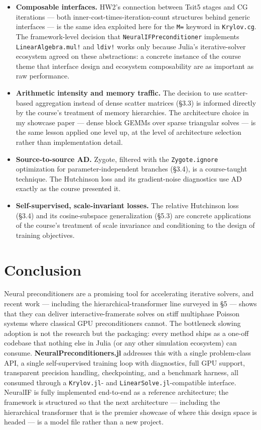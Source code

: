 \documentclass[11pt]{article}
\newcommand{\code}[1]{\texttt{\small #1}}
\begin{document}
\begin{itemize}[leftmargin=*, itemsep=2pt, topsep=2pt]
\item \textbf{Composable interfaces.} HW2's connection between Tsit5 stages and CG iterations --- both inner-cost-times-iteration-count structures behind generic interfaces --- is the same idea exploited here for the \code{M=} keyword in \code{Krylov.cg}. The framework-level decision that \code{NeuralIFPreconditioner} implements \code{LinearAlgebra.mul!} and \code{ldiv!} works only because Julia's iterative-solver ecosystem agreed on these abstractions: a concrete instance of the course theme that interface design and ecosystem composability are as important as raw performance.
\item \textbf{Arithmetic intensity and memory traffic.} The decision to use scatter-based aggregation instead of dense scatter matrices (\S3.3) is informed directly by the course's treatment of memory hierarchies. The architecture choice in my showcase paper --- dense block GEMMs over sparse triangular solves --- is the same lesson applied one level up, at the level of architecture selection rather than implementation detail.
\item \textbf{Source-to-source AD.} Zygote, filtered with the \code{Zygote.ignore} optimization for parameter-independent branches (\S3.4), is a course-taught technique. The Hutchinson loss and its gradient-noise diagnostics use AD exactly as the course presented it.
\item \textbf{Self-supervised, scale-invariant losses.} The relative Hutchinson loss (\S3.4) and its cosine-subspace generalization (\S5.3) are concrete applications of the course's treatment of scale invariance and conditioning to the design of training objectives.
\end{itemize}

\section{Conclusion}

Neural preconditioners are a promising tool for accelerating iterative solvers, and recent work --- including the hierarchical-transformer line surveyed in \S5 --- shows that they can deliver interactive-framerate solves on stiff multiphase Poisson systems where classical GPU preconditioners cannot. The bottleneck slowing adoption is not the research but the packaging: every method ships as a one-off codebase that nothing else in Julia (or any other simulation ecosystem) can consume. \textbf{NeuralPreconditioners.jl} addresses this with a single problem-class API, a single self-supervised training loop with diagnostics, full GPU support, transparent precision handling, checkpointing, and a benchmark harness, all consumed through a \code{Krylov.jl}- and \code{LinearSolve.jl}-compatible interface. NeuralIF is fully implemented end-to-end as a reference architecture; the framework is structured so that the next architecture --- including the hierarchical transformer that is the premier showcase of where this design space is headed --- is a model file rather than a new project.
\end{document}
